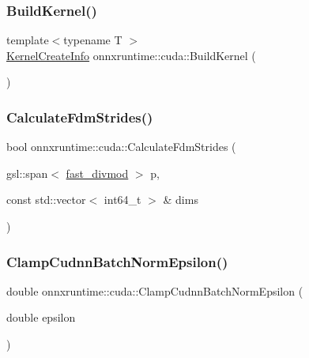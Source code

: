 \mbox{\label{namespaceonnxruntime_1_1cuda_a4cf9fae99ef47f1c08fda7013e95bca5}} 
\subsubsection{\texorpdfstring{Build\+Kernel()}{BuildKernel()}}
{\footnotesize\ttfamily template$<$typename T $>$ \\
\mbox{\hyperlink{structonnxruntime_1_1KernelCreateInfo}{Kernel\+Create\+Info}} onnxruntime\+::cuda\+::\+Build\+Kernel (\begin{DoxyParamCaption}{ }\end{DoxyParamCaption})}

\mbox{\label{namespaceonnxruntime_1_1cuda_ad1695824538013a3c72989f1a78ce5ec}} 
\subsubsection{\texorpdfstring{Calculate\+Fdm\+Strides()}{CalculateFdmStrides()}}
{\footnotesize\ttfamily bool onnxruntime\+::cuda\+::\+Calculate\+Fdm\+Strides (\begin{DoxyParamCaption}\item[{gsl\+::span$<$ \mbox{\hyperlink{classonnxruntime_1_1cuda_1_1fast__divmod}{fast\+\_\+divmod}} $>$}]{p,  }\item[{const std\+::vector$<$ int64\+\_\+t $>$ \&}]{dims }\end{DoxyParamCaption})\hspace{0.3cm}{\ttfamily [inline]}}

\mbox{\label{namespaceonnxruntime_1_1cuda_ada3a9cb32e02dd0c20c7d959500aac74}} 
\subsubsection{\texorpdfstring{Clamp\+Cudnn\+Batch\+Norm\+Epsilon()}{ClampCudnnBatchNormEpsilon()}}
{\footnotesize\ttfamily double onnxruntime\+::cuda\+::\+Clamp\+Cudnn\+Batch\+Norm\+Epsilon (\begin{DoxyParamCaption}\item[{double}]{epsilon }\end{DoxyParamCaption})\hspace{0.3cm}{\ttfamily [inline]}}

